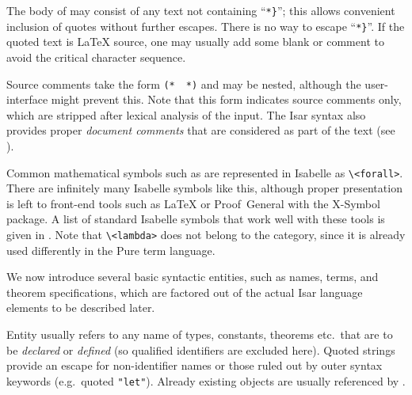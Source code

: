 \begin{isabellebody}
\begin{isamarkuptext}
  The body of \hyperlink{syntax.verbatim}{\mbox{}} may consist of any text not
  containing ``\verb|*|\verb|}|''; this allows
  convenient inclusion of quotes without further escapes.  There is no
  way to escape ``\verb|*|\verb|}|''.  If the quoted
  text is {\LaTeX} source, one may usually add some blank or comment
  to avoid the critical character sequence.

  Source comments take the form \verb|(*|~\isa{{\isachardoublequote}{\isasymdots}{\isachardoublequote}}~\verb|*)| and may be nested, although the user-interface
  might prevent this.  Note that this form indicates source comments
  only, which are stripped after lexical analysis of the input.  The
  Isar syntax also provides proper \emph{document comments} that are
  considered as part of the text (see ).

  Common mathematical symbols such as \isa{{\isasymforall}} are represented in
  Isabelle as \verb|\<forall>|.  There are infinitely many Isabelle
  symbols like this, although proper presentation is left to front-end
  tools such as {\LaTeX} or Proof~General with the X-Symbol package.
  A list of standard Isabelle symbols that work well with these tools
  is given in \cite[appendix~A]{isabelle-sys}.  Note that \verb|\<lambda>| does not belong to the  category, since it is
  already used differently in the Pure term language.%
\end{isamarkuptext}%
\isamarkuptrue%
%
\isamarkuptrue%
%
\begin{isamarkuptext}%
We now introduce several basic syntactic entities, such as names,
  terms, and theorem specifications, which are factored out of the
  actual Isar language elements to be described later.%
\end{isamarkuptext}%
\isamarkuptrue%
%
\isamarkuptrue%
%
\begin{isamarkuptext}%
Entity  usually refers to any name of types,
  constants, theorems etc.\ that are to be \emph{declared} or
  \emph{defined} (so qualified identifiers are excluded here).  Quoted
  strings provide an escape for non-identifier names or those ruled
  out by outer syntax keywords (e.g.\ quoted \verb|"let"|).
  Already existing objects are usually referenced by
  .


\end{isamarkuptext}
\end{isabellebody}
